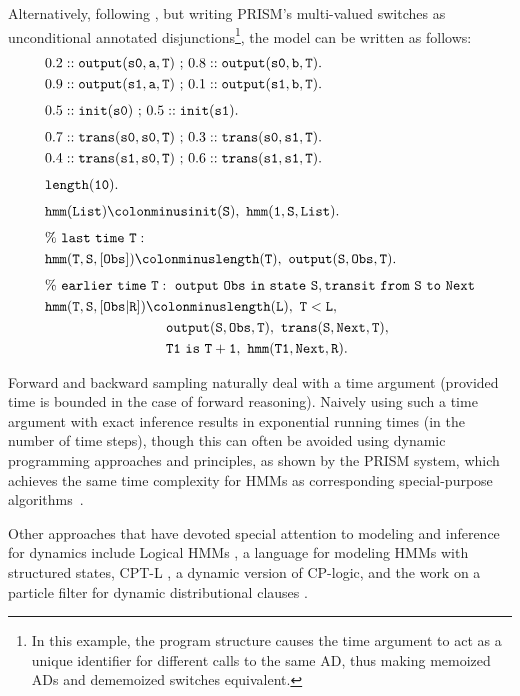 \documentclass[a4paper]{article}
\begin{document}
Alternatively, following \citet{sato:ijcai97}, but writing PRISM's
multi-valued switches as unconditional annotated
disjunctions\footnote{In this example, the program structure causes
  the  time argument to 
  act as a unique identifier for different calls to the same AD,
  thus making memoized ADs and dememoized switches equivalent.}, the
model can be written as follows:
\begin{align*}
&0.2::\mathtt{output(s0,a,T)}~\mathtt{;}~0.8::\mathtt{output(s0,b,T).}\\
&0.9::\mathtt{output(s1,a,T)}~\mathtt{;}~0.1::\mathtt{output(s1,b,T).}\\[4pt]
&0.5::\mathtt{init(s0)}~\mathtt{;}~0.5::\mathtt{init(s1).}\\[4pt]
&0.7::\mathtt{trans(s0,s0,T)}~\mathtt{;}~0.3::\mathtt{trans(s0,s1,T).}\\
&0.4::\mathtt{trans(s1,s0,T)}~\mathtt{;}~0.6::\mathtt{trans(s1,s1,T).}\\[4pt]
&\mathtt{length(10).}\\[4pt]
&\mathtt{hmm(List)}\colonminus\mathtt{init(S),~hmm(1,S,List).}\\[4pt]
&\%\mathtt{~last~ time ~T:} \\
&\mathtt{hmm(T,S,[Obs])}\colonminus\mathtt{length(T),~output(S,Obs,T).}\\[4pt]
&\%\mathtt{~earlier~ time ~T:~output~Obs~ in~ state~ S, transit ~from ~S~ to~ Next} \\
&\mathtt{hmm(T,S,[Obs|R])}\colonminus\mathtt{length(L), ~T<L,}\\
&~~~~~~~~~~~~~~~~~~~~~~~~~~\mathtt{output(S,Obs,T),~trans(S,Next,T),}\\
&~~~~~~~~~~~~~~~~~~~~~~~~~~\mathtt{T1 ~is~ T+1,~hmm(T1,Next,R).}
\end{align*}


Forward and backward sampling naturally
deal with a time argument (provided time is bounded in the case of
forward reasoning). Naively using
such a time argument with exact inference results in exponential
running times (in the number of time steps), though
this can often  be avoided using dynamic programming approaches and
principles, as shown by the PRISM system, which achieves the same time
complexity for HMMs as corresponding special-purpose
algorithms~\citep{SatoKameya:01}. 

Other approaches that have devoted special attention to modeling and inference for dynamics
include Logical HMMs \citep{kersting:jair06}, a language for modeling
HMMs with structured states, CPT-L \citep{thon:mlj11}, a dynamic
version of
CP-logic, and the work 
on a particle filter for dynamic distributional clauses \citep{Nitti13}.
\end{document}
